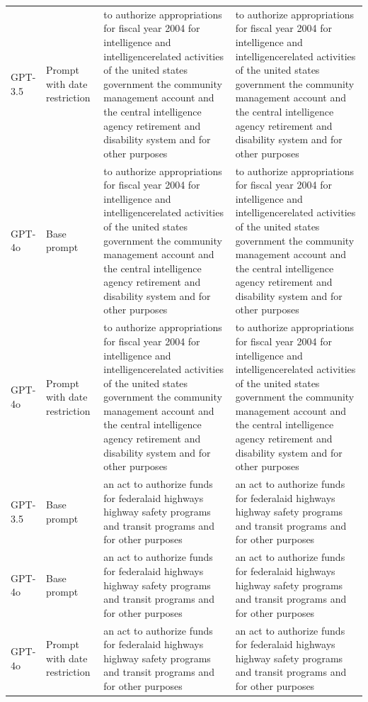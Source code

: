 \begin{longtable}{>{\raggedright\arraybackslash}p{1.4cm}>{\raggedright\arraybackslash}p{1.4cm}>{\raggedright\arraybackslash}p{5.5cm}>{\raggedright\arraybackslash}p{5.5cm}}
GPT-3.5 & Prompt with date restriction & to authorize appropriations for fiscal year 2004 for intelligence and intelligencerelated activities of the united states government the community management account and the central intelligence agency retirement and disability system and for other purposes & to authorize appropriations for fiscal year 2004 for intelligence and intelligencerelated activities of the united states government the community management account and the central intelligence agency retirement and disability system and for other purposes\\
GPT-4o & Base prompt & to authorize appropriations for fiscal year 2004 for intelligence and intelligencerelated activities of the united states government the community management account and the central intelligence agency retirement and disability system and for other purposes & to authorize appropriations for fiscal year 2004 for intelligence and intelligencerelated activities of the united states government the community management account and the central intelligence agency retirement and disability system and for other purposes\\
GPT-4o & Prompt with date restriction & to authorize appropriations for fiscal year 2004 for intelligence and intelligencerelated activities of the united states government the community management account and the central intelligence agency retirement and disability system and for other purposes & to authorize appropriations for fiscal year 2004 for intelligence and intelligencerelated activities of the united states government the community management account and the central intelligence agency retirement and disability system and for other purposes\\
GPT-3.5 & Base prompt & an act to authorize funds for federalaid highways highway safety programs and transit programs and for other purposes & an act to authorize funds for federalaid highways highway safety programs and transit programs and for other purposes\\
GPT-4o & Base prompt & an act to authorize funds for federalaid highways highway safety programs and transit programs and for other purposes & an act to authorize funds for federalaid highways highway safety programs and transit programs and for other purposes\\
GPT-4o & Prompt with date restriction & an act to authorize funds for federalaid highways highway safety programs and transit programs and for other purposes & an act to authorize funds for federalaid highways highway safety programs and transit programs and for other purposes\\

\end{longtable}
